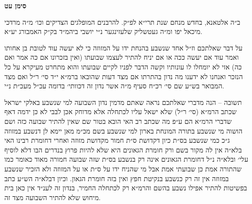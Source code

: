 \documentclass[12pt, openany]{book}
\newcommand{\chapname}{}
\newcommand{\newchap}[1]{
	\addcontentsline{toc}{chapter}{#1}
	\renewcommand{\chapname}{#1}
		\begin{center}
			\textbf{%
\fontsize{16pt}{16pt}\selectfont
				#1}
		\end{center}
}
\begin{document}
\newchap{סימן עט}
\begin{multicols}{2}
ב״ה אלטאנא, בחדש מנחם שנת תרי״א לפ״ק. להרבנים המופלגים הצדיקים וכו׳ מ״ה מרדכי מיכאל יפו ומ״ה געטשליק שלעזינגער נ״י יושבי ביהמ״ד בק״ק האמבורג יע״א.\\\vspace{0pt}

על דבר שאלתכם וז״ל אחד שנשבע בהנחת ידו על המזוזה כי לא יעשה עוד לטובת בן אחותו ואמר עוד אם יעשה ככה או אם יניח להתיר לעצמו שבועתו (ואין בזכרונו אם כה אמר ואם כה) אזי לא יומחלו לו עונותיו וקשה הדבר לפניו לקיים שבועתו והוא מתחרט מעיקרא על כל הנזכר ואנחנו לא ידענו מה נדון בהתרתו אם מצד דעות שהובאו ברמ״א י״ד סי׳ ר״ל ואם מצד המבואר בש״ע שם סי׳ רכ״ח סעיף מ״ה אשר נדון זה דכוותי׳ בדומה עכ״ל מעכ״ת נ״י.\\\vspace{0pt}

תשובה – הנה מדברי שאלתכם נראה שאתם מדמין נדון השבועה למי שנשבע באלקי ישראל שכתב הרמ״א (סי׳ ר״ל) שלא ישאל עליו לכתחלה אלא מדוחק אכן לבבי לא כן ידמה דאף שדברי הרמ״א הם ע״פ מה שכתב רב האי הובא בטור שם שאין להתיר שבועה כזה ושם הושוה מי שנשבע בתורה המונחת בארון למי שנשבע בשם מכ״מ מאן יימא לן דנשבע במזוזה ג״כ כמי שנשבע בס״ת כיון דקדושת ס״ת חמור מקדושת מזוזה ואחרי דחומרת רבינו האי בלא״ה אין לה מקור בשם ורק חומרת הגאונים היא שלא להיות פרוץ בנדרים הבו דלא לוסיף עלי׳ ובלא״ה נ״ל דחומרת הגאונים אינה רק בנשבע בס״ת שזה שבועה חמורה מאוד כאומר כמו שהתורה אמת כן שבועתי אמת אבל מי שהניח ידו על ס״ת או על המזוזה ולא הזכיר שנשבע במזוזה אין זה רק כנשבע בנקיטת חפץ ואין בזה חומרת הגאון. וכיון דבלא״ה הש״ע כתב בפשיטות להתיר אפילו נשבע בהשם והרמ״א רק לכתחלה החמיר, בנדון זה לענ״ד אין כאן בית מיחוש שלא להתיר השבועה מצד זה.\\\vspace{0pt}


\end{multicols}
\end{document}
